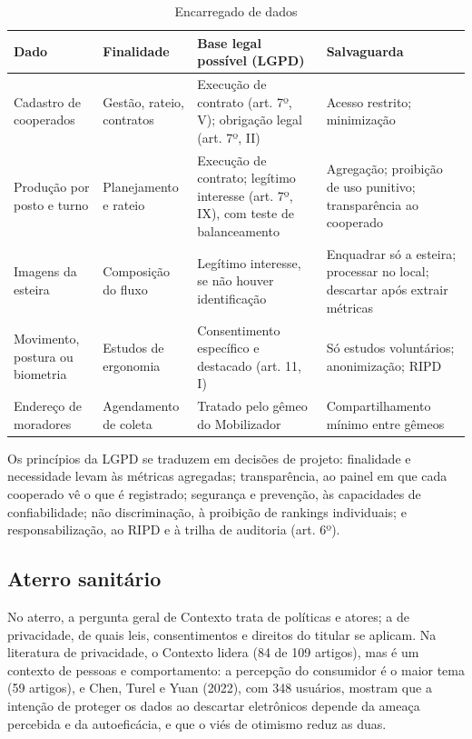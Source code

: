 \documentclass[12pt,a4paper,article,oneside,english,brazil]{abntex2}
\newcommand{\fontetab}[1]{\par\vspace{3pt}{\small\noindent Fonte: #1\par}}
\begin{document}
\begin{table}[!htbp]
\centering
\caption{Encarregado de dados}
\label{tab:encarregado}
\footnotesize
\begin{tabularx}{\linewidth}{>{\raggedright\arraybackslash}p{2.7cm} >{\raggedright\arraybackslash}p{2.4cm} Y Y}
\hline
\textbf{Dado} & \textbf{Finalidade} & \textbf{Base legal possível (LGPD)} & \textbf{Salvaguarda}\\
\hline
Cadastro de cooperados & Gestão, rateio, contratos & Execução de contrato (art. 7º, V); obrigação legal (art. 7º, II) & Acesso restrito; minimização\\
Produção por posto e turno & Planejamento e rateio & Execução de contrato; legítimo interesse (art. 7º, IX), com teste de balanceamento & Agregação; proibição de uso punitivo; transparência ao cooperado\\
Imagens da esteira & Composição do fluxo & Legítimo interesse, se não houver identificação & Enquadrar só a esteira; processar no local; descartar após extrair métricas\\
Movimento, postura ou biometria & Estudos de ergonomia & Consentimento específico e destacado (art. 11, I) & Só estudos voluntários; anonimização; RIPD\\
Endereço de moradores & Agendamento de coleta & Tratado pelo gêmeo do Mobilizador & Compartilhamento mínimo entre gêmeos\\
\hline
\end{tabularx}
\fontetab{Elaborado pelo autor (2026).}
\end{table}

Os princípios da LGPD se traduzem em decisões de projeto: finalidade e necessidade levam às métricas agregadas; transparência, ao painel em que cada cooperado vê o que é registrado; segurança e prevenção, às capacidades de confiabilidade; não discriminação, à proibição de rankings individuais; e responsabilização, ao RIPD e à trilha de auditoria (art. 6º).

\subsection{Aterro sanitário}

No aterro, a pergunta geral de Contexto trata de políticas e atores; a de privacidade, de quais leis, consentimentos e direitos do titular se aplicam. Na literatura de privacidade, o Contexto lidera (84 de 109 artigos), mas é um contexto de pessoas e comportamento: a percepção do consumidor é o maior tema (59 artigos), e Chen, Turel e Yuan (2022), com 348 usuários, mostram que a intenção de proteger os dados ao descartar eletrônicos depende da ameaça percebida e da autoeficácia, e que o viés de otimismo reduz as duas.
\end{document}
